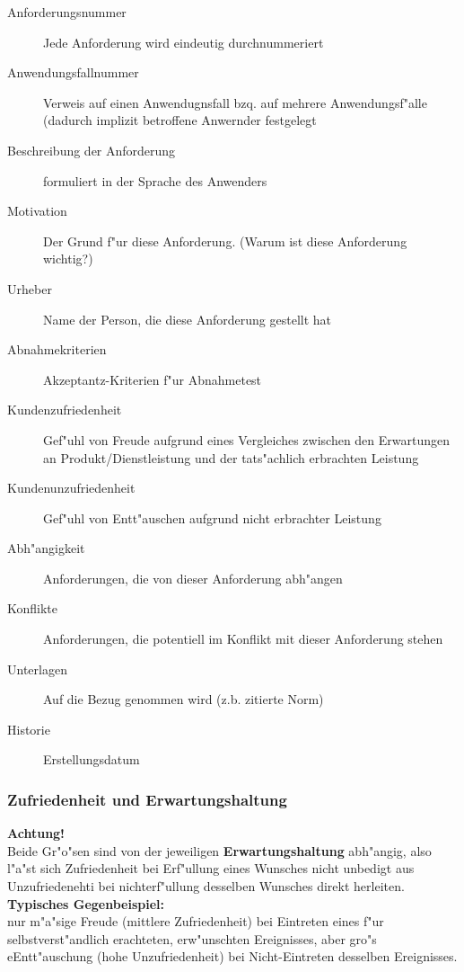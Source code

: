 \begin{description}
    \item[Anforderungsnummer] Jede Anforderung wird eindeutig durchnummeriert
    \item[Anwendungsfallnummer] Verweis auf einen Anwendugnsfall bzq. auf mehrere Anwendungsf"alle (dadurch implizit betroffene Anwernder festgelegt
    \item[Beschreibung der Anforderung] formuliert in der Sprache des Anwenders
    \item[Motivation] Der Grund f"ur diese Anforderung. (Warum ist diese Anforderung wichtig?)
    \item[Urheber] Name der Person, die diese Anforderung gestellt hat
    \item[Abnahmekriterien] Akzeptantz-Kriterien f"ur Abnahmetest
    \item[Kundenzufriedenheit] Gef"uhl von Freude aufgrund eines Vergleiches zwischen den Erwartungen an Produkt/Dienstleistung und der tats"achlich erbrachten Leistung
    \item[Kundenunzufriedenheit] Gef"uhl von Entt"auschen aufgrund nicht erbrachter Leistung
    \item[Abh"angigkeit] Anforderungen, die von dieser Anforderung abh"angen
    \item[Konflikte] Anforderungen, die potentiell im Konflikt mit dieser Anforderung stehen
    \item[Unterlagen] Auf die Bezug genommen wird (z.b. zitierte Norm)
    \item[Historie] Erstellungsdatum
\end{description}

\subsubsection{Zufriedenheit und Erwartungshaltung}
\textbf{Achtung!}\\
Beide Gr"o"sen sind von der jeweiligen \textbf{Erwartungshaltung} abh"angig, also l"a"st sich Zufriedenheit bei Erf"ullung eines Wunsches nicht unbedigt aus Unzufriedenehti bei nichterf"ullung desselben Wunsches direkt herleiten.\\
\textbf{Typisches Gegenbeispiel:}\\
nur m"a"sige Freude (mittlere Zufriedenheit) bei Eintreten eines f"ur selbstverst"andlich erachteten, erw"unschten Ereignisses, aber gro"s eEntt"auschung (hohe Unzufriedenheit) bei Nicht-Eintreten desselben Ereignisses.

